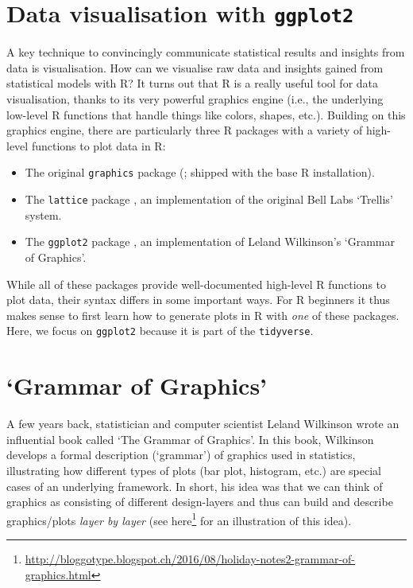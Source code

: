 \documentclass[
  12pt,
]{style/krantz}
\providecommand{\tightlist}{%
  \setlength{\itemsep}{0pt}\setlength{\parskip}{0pt}}
\renewcommand{\href}[2]{#2\footnote{\url{#1}}}
\begin{document}
\hypertarget{data-visualisation-with-ggplot2}{%
\section{\texorpdfstring{Data visualisation with \texttt{ggplot2}}{Data visualisation with ggplot2}}\label{data-visualisation-with-ggplot2}}

A key technique to convincingly communicate statistical results and insights from data is visualisation. How can we visualise raw data and insights gained from statistical models with R? It turns out that R is a really useful tool for data visualisation, thanks to its very powerful graphics engine (i.e., the underlying low-level R functions that handle things like colors, shapes, etc.). Building on this graphics engine, there are particularly three R packages with a variety of high-level functions to plot data in R:

\begin{itemize}
\tightlist
\item
  The original \texttt{graphics} package (\citet{r_2018}; shipped with the base R installation).
\item
  The \texttt{lattice} package \citep{lattice_2008}, an implementation of the original Bell Labs `Trellis' system.
\item
  The \texttt{ggplot2} package \citep{wickham_2016}, an implementation of Leland Wilkinson's `Grammar of Graphics'.
\end{itemize}

While all of these packages provide well-documented high-level R functions to plot data, their syntax differs in some important ways. For R beginners it thus makes sense to first learn how to generate plots in R with \emph{one} of these packages. Here, we focus on \texttt{ggplot2} because it is part of the \texttt{tidyverse}.

\hypertarget{grammar-of-graphics}{%
\section{`Grammar of Graphics'}\label{grammar-of-graphics}}

A few years back, statistician and computer scientist Leland Wilkinson wrote an influential book called `The Grammar of Graphics'. In this book, Wilkinson develops a formal description (`grammar') of graphics used in statistics, illustrating how different types of plots (bar plot, histogram, etc.) are special cases of an underlying framework. In short, his idea was that we can think of graphics as consisting of different design-layers and thus can build and describe graphics/plots \emph{layer by layer} (see \href{http://bloggotype.blogspot.ch/2016/08/holiday-notes2-grammar-of-graphics.html}{here} for an illustration of this idea).
\end{document}
